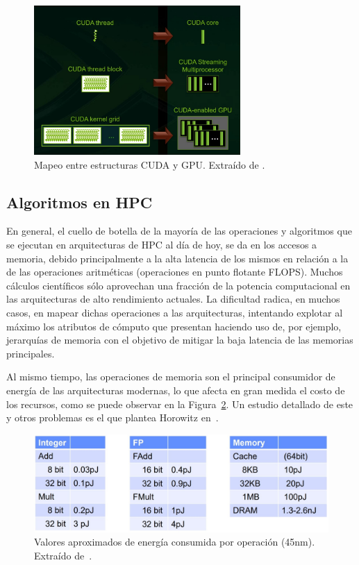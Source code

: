 \begin{figure}
    \centering
    \includegraphics[width=0.7\textwidth]{imagenes/chapter2/cuda-gpu.jpg}
    \caption{Mapeo entre estructuras CUDA y GPU. Extraído de \cite{cuda-programming-guide}.}
    \label{fig:cuda-gpu}
\end{figure}


\subsection{Algoritmos en HPC}

En general, el cuello de botella de la mayoría de las operaciones y algoritmos que se ejecutan en arquitecturas de HPC al día de hoy, se da en los accesos a memoria, debido principalmente a la alta latencia de los mismos en relación a la de las %
operaciones aritméticas (operaciones en punto flotante FLOPS). Muchos cálculos científicos sólo aprovechan una fracción de la potencia computacional en las arquitecturas de alto rendimiento actuales. La dificultad radica, en muchos casos, en mapear dichas operaciones a las arquitecturas, intentando explotar al máximo los atributos de cómputo que presentan haciendo uso de, por ejemplo, jerarquías de memoria con el objetivo de mitigar la baja latencia de las memorias principales.

Al mismo tiempo, las operaciones de memoria son el principal consumidor de energía de las arquitecturas modernas, lo que afecta en gran medida el costo de los recursos, como se puede observar en la Figura~\ref{fig:horowitz-energy}. Un estudio  detallado de este y otros problemas es el que plantea Horowitz en~\cite{Horowitz2014}.

\begin{figure}
    \centering
    \includegraphics[width=\textwidth]{imagenes/chapter2/horowitz-energy.jpg}
    \caption{Valores aproximados de energía consumida por operación (45nm). Extraído de~\cite{Horowitz2014}.}
    \label{fig:horowitz-energy}
\end{figure}

